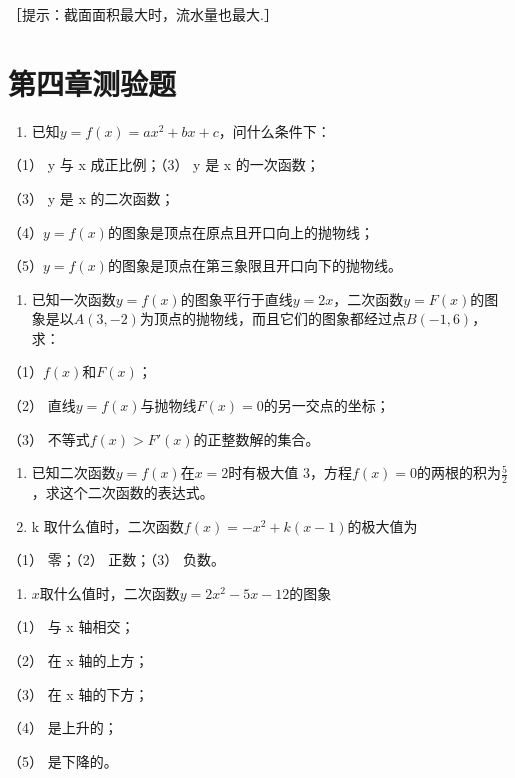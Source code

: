 ［提示：截面面积最大时，流水量也最大.］

\section{第四章测验题}

\begin{enumerate}
\item
  已知\(y = f(x) = ax^2 + bx + c\)，问什么条件下：
\end{enumerate}

（1） y 与 x 成正比例；（3） y 是 x 的一次函数；

（3） y 是 x 的二次函数；

（4）\(y = f(x)\)的图象是顶点在原点且开口向上的抛物线；

（5）\(y = f(x)\)的图象是顶点在第三象限且开口向下的抛物线。

\begin{enumerate}[start=2]
\item
  已知一次函数\(y = f(x)\)的图象平行于直线\(y = 2x\)，二次函数\(y = F(x)\)的图象是以\(A(3, -2)\)为顶点的抛物线，而且它们的图象都经过点\(B(-1, 6)\)，求：
\end{enumerate}

（1）\(f(x)\)和\(F(x)\)；

（2） 直线\(y=f(x)\)与抛物线\(F(x)=0\)的另一交点的坐标；

（3） 不等式\(f(x) > F'(x)\)的正整数解的集合。

\begin{enumerate}[start=3]
\item
  已知二次函数\(y = f(x)\)在\(x = 2\)时有极大值
  3，方程\(f(x) = 0\)的两根的积为\(\frac{5}{2}\)，求这个二次函数的表达式。
\item
  k 取什么值时，二次函数\(f(x)=-x^{2}+k(x-1)\)的极大值为
\end{enumerate}

（1） 零；（2） 正数；（3） 负数。

\begin{enumerate}[start=5]
\item
  \(x\)取什么值时，二次函数\(y = 2x^{2} - 5x - 12\)的图象
\end{enumerate}

（1） 与 x 轴相交；

（2） 在 x 轴的上方；

（3） 在 x 轴的下方；

（4） 是上升的；

（5） 是下降的。

